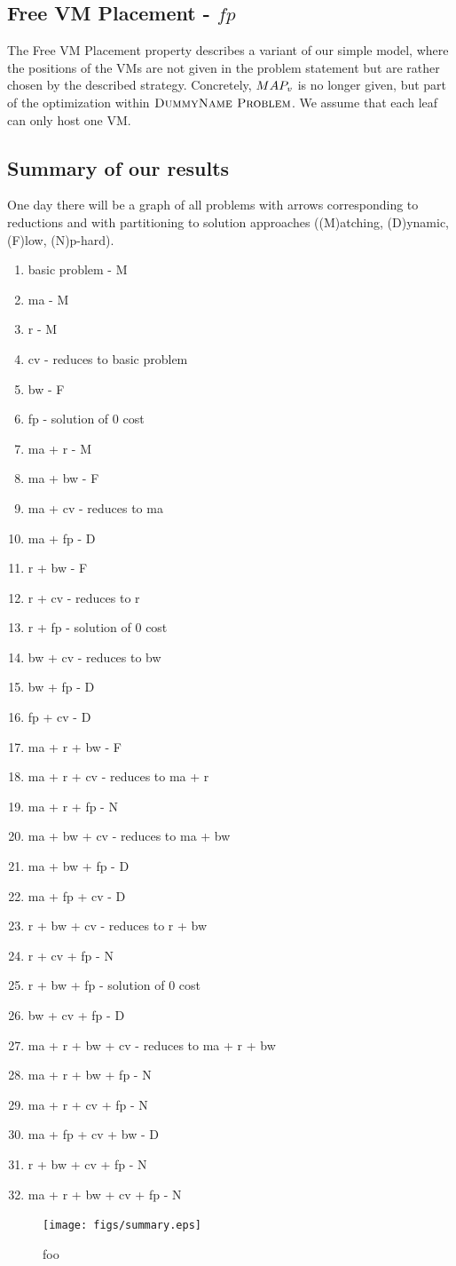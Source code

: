 \subsection{Free VM Placement - $fp$}

The Free VM Placement property describes a variant of our simple model, where 
the positions of the VMs are not given in the problem statement but are 
rather chosen by the described strategy. Concretely, $MAP_v$ is no 
longer given, but part of the optimization within $\textsc{DummyName Problem}$. We assume that 
each leaf can only host one VM.


\subsection{Summary of our results}

One day there will be a graph of all problems with arrows
corresponding to reductions and with partitioning to solution
approaches ((M)atching, (D)ynamic, (F)low, (N)p-hard).

\begin{enumerate}
\item basic problem - M
\item ma - M
\item r - M
\item cv - reduces to basic problem
\item bw - F
\item fp - solution of 0 cost
\item ma + r - M
\item  ma + bw - F
\item ma + cv - reduces to ma
\item ma + fp - D
\item r + bw - F
\item r + cv - reduces to r
\item r + fp - solution of 0 cost
\item bw + cv - reduces to bw
\item bw + fp - D
\item fp + cv - D
\item ma + r + bw - F
\item ma + r + cv - reduces to ma + r
\item ma + r + fp - N
\item ma + bw + cv - reduces to ma + bw
\item ma + bw + fp - D
\item ma + fp + cv - D
\item r + bw + cv - reduces to r + bw
\item r + cv + fp - N
\item r + bw + fp - solution of 0 cost
\item bw + cv + fp - D
\item ma + r + bw + cv - reduces to ma + r + bw
\item ma + r + bw + fp - N
\item ma + r + cv + fp - N
\item ma + fp + cv + bw - D
\item r + bw + cv + fp - N
\item ma + r + bw + cv + fp - N
\end{enumerate}


\begin{figure}[htbp]
\texttt{[image: figs/summary.eps]}
\caption{foo}
\label{fig:summary}
\end{figure}

